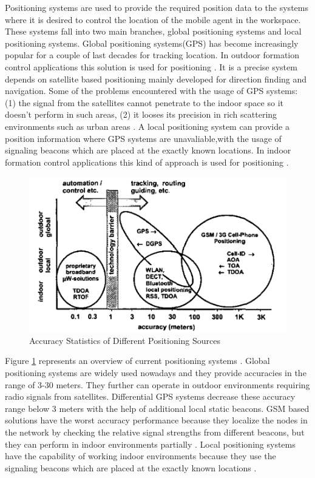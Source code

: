 Positioning systems are used to provide the required position data to the systems where it is desired to control the location of the mobile agent in the workspace. 
These systems fall into two main branches, global positioning systems and local positioning systems. Global positioning systems(GPS) has become increasingly popular for a couple of last decades for tracking location. In outdoor formation control applications this solution is used for positioning \cite{29}. It is a precise system depends on satellite based positioning mainly developed for direction finding and navigation.  Some of the problems encountered with the usage of GPS systems: (1) the signal from the satellites cannot penetrate to the indoor space so it doesn't perform in such areas, (2) it looses its precision in rich scattering environments such as urban areas \cite{19}.  A local positioning system can provide a position information where GPS systems are unavaliable,with the usage of signaling beacons which are placed at the exactly known locations. In indoor formation control applications this kind of approach is used for positioning \cite{96}. 




\begin{figure}[H]
	\caption{Accuracy Statistics of Different Positioning Sources \cite{20}} \label{overview_position}
	\centering
	\includegraphics[scale = 0.4]{gps}
\end{figure} 

Figure \ref{overview_position} represents an overview of current positioning systems \cite{20}. Global positioning systems are widely used nowadays and they provide accuracies in the range of 3-30 meters. They further can operate in outdoor environments requiring radio signals from satellites. Differential GPS systems decrease these accuracy range below 3 meters with the help of additional local static beacons. GSM based solutions have the worst accuracy performance because they localize the nodes in the network by checking the relative signal strengths from different beacons, but they can perform in indoor environments partially \cite{20}.  Local positioning systems have the capability of working indoor environments because they use the signaling beacons which are placed at the exactly known locations \cite{20}. 

